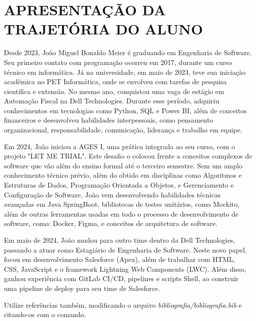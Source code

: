 \chapter[APRESENTAÇÃO DA TRAJETÓRIA DO ALUNO]{APRESENTAÇÃO DA TRAJETÓRIA DO ALUNO}

Desde 2023, João Miguel Bonaldo Meier é graduando em Engenharia de Software. Seu primeiro contato com programação ocorreu em 2017, durante um curso técnico em informática. Já na universidade, em maio de 2023, teve sua iniciação acadêmica no PET Informática, onde se envolveu com tarefas de pesquisa científica e extensão. No mesmo ano, conquistou uma vaga de estágio em Automação Fiscal na Dell Technologies. Durante esse período, adquiriu conhecimentos em tecnologias como Python, SQL e Power BI, além de conceitos financeiros e desenvolveu habilidades interpessoais, como pensamento organizacional, responsabilidade, comunicação, liderança e trabalho em equipe.

Em 2024, João iniciou a AGES I, uma prática integrada ao seu curso, com o projeto "LET ME TRIAL". Este desafio o colocou frente a conceitos complexos de software que vão além do ensino formal até o terceiro semestre. Sem um amplo conhecimento técnico prévio, além do obtido em disciplinas como Algoritmos e Estruturas de Dados, Programação Orientada a Objetos, e Gerenciamento e Configuração de Software, João vem desenvolvendo habilidades técnicas avançadas em Java SpringBoot, bibliotecas de testes unitários, como Mockito, além de outras ferramentas usadas em todo o processo de desenvolvimento de software, como: Docker, Figma, e conceitos de arquitetura de software.

Em maio de 2024, João mudou para outro time dentro da Dell Technologies, passando a atuar como Estagiário de Engenharia de Software. Neste novo papel, focou em desenvolvimento Salesforce (Apex), além de trabalhar com HTML, CSS, JavaScript e o framework Lightning Web Components (LWC). Além disso, ganhou experiência com GitLab CI/CD, pipelines e scripts Shell, ao construir uma pipeline de deploy para seu time de Salesforce.


Utilize referências também, modificando o arquivo \textit{bibliografia/bibliografia.bib} e citando-os com o comando\cite{artigo}.
    